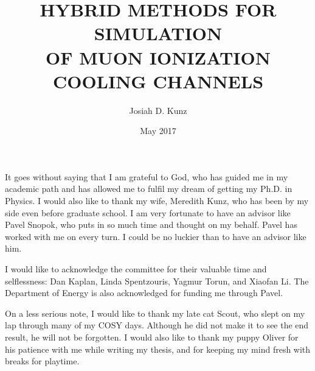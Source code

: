 \title{HYBRID METHODS FOR SIMULATION\\OF MUON IONIZATION COOLING CHANNELS}
\author{Josiah D. Kunz}
\date{May 2017}

\copyrightnoticefalse


\maketitle

\prelimpages


\begin{acknowledgement}

It goes without saying that I am grateful to God, who has guided me in my academic path and has allowed me to fulfil my dream of getting my Ph.D. in Physics. I would also like to thank my wife, Meredith Kunz, who has been by my side even before graduate school. I am very fortunate to have an advisor like Pavel Snopok, who puts in so much time and thought on my behalf. Pavel has worked with me on every turn. I could be no luckier than to have an advisor like him. 

I would like to acknowledge the committee for their valuable time and selflessness: Dan Kaplan, Linda Spentzouris, Yagmur Torun, and Xiaofan Li. The Department of Energy is also acknowledged for funding me through Pavel.

On a less serious note, I would like to thank my late cat Scout, who slept on my lap through many of my COSY days. Although he did not make it to see the end result, he will not be forgotten. I would also like to thank my puppy Oliver for his patience with me while writing my thesis, and for keeping my mind fresh with breaks for playtime.

\end{acknowledgement}


\tableofcontents
\clearpage

\listoftables
\clearpage

\listoffigures
\clearpage
